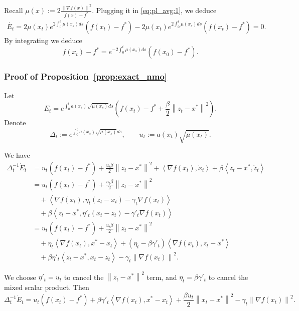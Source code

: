 \documentclass{article}
\newcommand{\norm}[1]{\left\lVert#1\right\rVert}
\newcommand{\dotprod}[1]{\left< #1\right>}
\theoremstyle{plain}
\theoremstyle{definition}
\theoremstyle{remark}
\begin{document}
    Recall $\mu(x) := 2\frac{\norm{\nabla f(x)}^2}{f(x)-f^\ast}$. Plugging it in \eqref{eq:pl_avg:1}, we deduce
    \begin{align}
        \dot{E_t} = 2\mu(x_t)e^{2\int_{0}^t \mu(x_s)ds}(f(x_t)-f^\ast) - 2\mu(x_t)e^{2\int_{0}^t \mu(x_s)ds}(f(x_t)-f^\ast)=0.
    \end{align}
    By integrating we deduce 
    \begin{equation}
        f(x_t)-f^\ast = e^{-2\int_{0}^t \mu(x_s)ds}(f(x_0)-f^\ast).
    \end{equation}


\subsubsection{Proof of Proposition~\ref{prop:exact_nmo}}

Let
\begin{equation}
    E_t
    =
    e^{\int_0^t a(x_s)\sqrt{\mu(x_s)}ds}
    \left(f(x_t)-f^\ast + \frac{\beta}{2}\norm{z_t-x^\ast}^2\right).
\end{equation}
Denote
\[
\Delta_t := e^{\int_0^t a(x_s)\sqrt{\mu(x_s)}ds},
\qquad
u_t := a(x_t)\sqrt{\mu(x_t)}.
\]

We have
\begin{align}
    \Delta_t^{-1}\dot E_t
    &= u_t(f(x_t)-f^\ast)
    + \frac{u_t\beta}{2}\norm{z_t-x^\ast}^2
    + \dotprod{\nabla f(x_t),\dot x_t}
    + \beta\dotprod{z_t-x^\ast,\dot z_t} \nonumber\\
    &= u_t(f(x_t)-f^\ast)
    + \frac{u_t\beta}{2}\norm{z_t-x^\ast}^2 \nonumber\\
    &\quad
    + \dotprod{\nabla f(x_t),\eta_t(z_t-x_t)-\gamma_t\nabla f(x_t)} \nonumber\\
    &\quad
    + \beta\dotprod{z_t-x^\ast,\eta'_t(x_t-z_t)-\gamma'_t\nabla f(x_t)} \nonumber\\
    &= u_t(f(x_t)-f^\ast)
    + \frac{u_t\beta}{2}\norm{z_t-x^\ast}^2 \nonumber\\
    &\quad
    + \eta_t\dotprod{\nabla f(x_t),x^\ast-x_t}
    + (\eta_t-\beta\gamma'_t)\dotprod{\nabla f(x_t),z_t-x^\ast} \nonumber\\
    &\quad
    + \beta\eta'_t\dotprod{z_t-x^\ast,x_t-z_t}
    - \gamma_t\norm{\nabla f(x_t)}^2 .
\end{align}

We choose $\eta'_t = u_t$ to cancel the $\norm{z_t-x^\ast}^2$ term, and
$\eta_t = \beta\gamma'_t$ to cancel the mixed scalar product. Then
\begin{equation}\label{eq:exact:nest_ode_1_corr}
    \Delta_t^{-1}\dot E_t
    =
    u_t(f(x_t)-f^\ast)
    + \beta\gamma'_t\dotprod{\nabla f(x_t),x^\ast-x_t}
    + \frac{\beta u_t}{2}\norm{x_t-x^\ast}^2
    - \gamma_t\norm{\nabla f(x_t)}^2 .
\end{equation}
\end{document}
